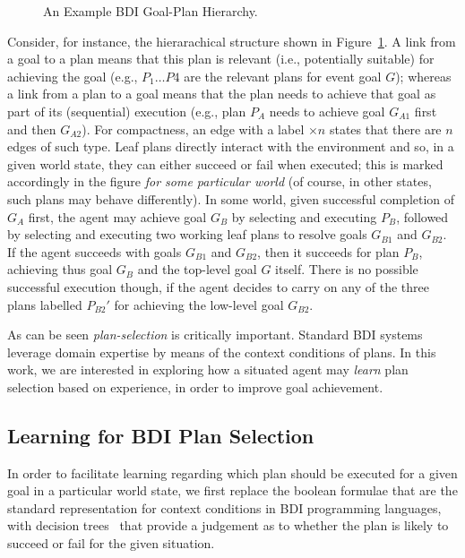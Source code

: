\begin{figure}[t]
\begin{center}
\resizebox{.6\textwidth}{!}{}
\end{center}
\vskip -0.5cm
\caption{An Example BDI Goal-Plan Hierarchy.}
\label{fig:T3}
\end{figure}

Consider, for instance, the hierarachical structure shown in Figure~\ref{fig:T3}.
A link from a goal to a plan means that this plan is relevant (i.e., potentially
suitable) for achieving the goal (e.g., $P_1 \ldots P4$ are the relevant plans
for event goal $G$); whereas a link from a plan to a goal means that the plan
needs to achieve that goal as part of its (sequential) execution (e.g., plan
$P_A$ needs to achieve goal $G_{A1}$ first and then $G_{A2}$).
For compactness, an edge with a label $\times n$ states that there are $n$ edges
of such type.
Leaf plans directly interact with the environment and so, in a given world state,
they can either succeed or fail when executed; this is marked accordingly in the
figure \emph{for some particular world} (of course, in other states, such plans
may behave differently).
In some world, given successful completion of $G_A$ first, the agent may achieve
goal $G_B$ by selecting and executing $P_B$, followed by selecting and executing two working leaf plans to resolve goals $G_{B1}$ and $G_{B2}$. If the agent
succeeds with goals $G_{B1}$ and $G_{B2}$, then it succeeds for plan $P_B$,
achieving thus goal $G_B$ and the top-level goal $G$ itself. There is no possible
successful execution though, if the agent decides to carry on any of the three
plans labelled $P_{B2}'$ for achieving the low-level goal $G_{B2}$.


As can be seen \textit{plan-selection} is critically important.
Standard BDI systems leverage domain
expertise by means of the context conditions of plans.
In this work, we are interested in exploring how a situated agent may
\emph{learn} plan selection based on experience, in order to improve goal
achievement. 


\subsection{Learning for BDI Plan Selection} \label{subsec:bdi_learning}
In order to facilitate learning regarding which plan should be
executed for a given goal in a particular world state, we first replace the
boolean formulae that are the standard representation for context
conditions in BDI programming languages, with decision
trees~\cite{Mitchell97:ML} that provide a judgement as to whether the
plan is likely to succeed or fail for the given situation. 

